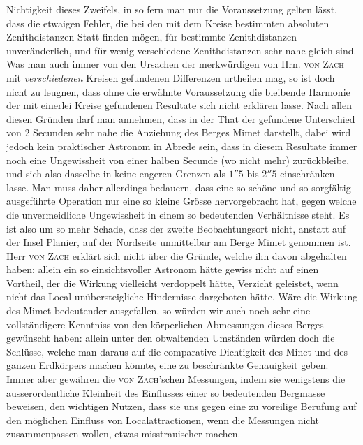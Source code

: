 Nichtigkeit dieses Zweifels, in so fern man nur die Voraussetzung gelten lässt, dass die etwaigen Fehler, die bei den mit dem Kreise bestimmten absoluten Zenithdistanzen Statt finden mögen, für bestimmte Zenithdistanzen unveränderlich, und für wenig verschiedene Zenithdistanzen sehr nahe gleich sind. Was man auch immer von den Ursachen der merkwürdigen von Hrn. \textsc{von Zach} mit \emph{verschiedenen} Kreisen gefundenen Differenzen urtheilen mag, so ist doch nicht zu leugnen, dass ohne die erwähnte Voraussetzung die bleibende Harmonie der mit einerlei Kreise gefundenen Resultate sich nicht erklären lasse. Nach allen diesen Gründen darf man annehmen, dass in der That der gefundene Unterschied von 2 Secunden sehr nahe die Anziehung des Berges Mimet darstellt, dabei wird jedoch kein praktischer Astronom in Abrede sein, dass in diesem Resultate immer noch eine Ungewissheit von einer halben Secunde (wo nicht mehr) zurückbleibe, und sich also dasselbe in keine engeren Grenzen als $1''5$ bis $2''5$ einschränken lasse. Man muss daher allerdings bedauern, dass eine so schöne und so sorgfältig ausgeführte Operation nur eine so kleine Grösse hervorgebracht hat, gegen welche die unvermeidliche Ungewissheit in einem so bedeutenden Verhältnisse steht. Es ist also um so mehr Schade, dass der zweite Beobachtungsort nicht, anstatt auf der Insel Planier, auf der Nordseite unmittelbar am Berge Mimet genommen ist. Herr \textsc{von Zach} erklärt sich nicht über die Gründe, welche ihn davon abgehalten haben: allein ein so einsichtsvoller Astronom hätte gewiss nicht auf einen Vortheil, der die Wirkung vielleicht verdoppelt hätte, Verzicht geleistet, wenn nicht das Local unübersteigliche Hindernisse dargeboten hätte. Wäre die Wirkung des Mimet bedeutender ausgefallen, so würden wir auch noch sehr eine vollständigere Kenntniss von den körperlichen Abmessungen dieses Berges gewünscht haben: allein unter den obwaltenden Umständen würden doch die Schlüsse, welche man daraus auf die comparative Dichtigkeit des Minet und des ganzen Erdkörpers machen könnte, eine zu beschränkte Genauigkeit geben. Immer aber gewähren die \textsc{von Zach}'schen Messungen, indem sie wenigstens die ausserordentliche Kleinheit des Einflusses einer so bedeutenden Bergmasse beweisen, den wichtigen Nutzen, dass sie uns gegen eine zu voreilige Berufung auf den möglichen Einfluss von Localattractionen, wenn die Messungen nicht zusammenpassen wollen, etwas misstrauischer machen.

